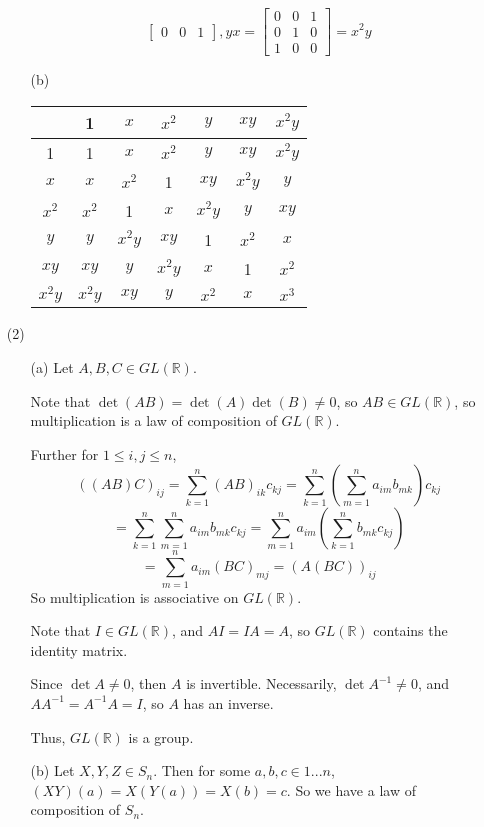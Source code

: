 \begin{itemize}
\begin{itemize}
$$\begin{bmatrix}
0 & 0 & 1
\end{bmatrix}, yx = \begin{bmatrix}
0 & 0 & 1 \\
0 & 1 & 0 \\
1 & 0 & 0
\end{bmatrix} = x^2y$$
\item[(b)]
\begin{tabular}{| c || c | c | c | c | c | c |}
\hline
& 1 & $x$ & $x^2$ & $y$ & $xy$ & $x^2y$ \\
\hline \hline
1 & 1 & $x$ & $x^2$ & $y$ & $xy$ & $x^2y$ \\
\hline
$x$ & $x$ & $x^2$ & 1 & $xy$ & $x^2y$ & $y$ \\
\hline
$x^2$ & $x^2$ & 1 & $x$ & $x^2y$ & $y$ & $xy$ \\
\hline
$y$ & $y$ & $x^2y$ & $xy$ & 1 & $x^2$ & $x$ \\
\hline
$xy$ & $xy$ & $y$ & $x^2y$ & $x$ & 1 & $x^2$ \\
\hline
$x^2y$ & $x^2y$ & $xy$ & $y$ & $x^2$ & $x$ & $x^3$ \\
\hline
\end{tabular}
\end{itemize}
\item[(2)]
\begin{itemize}
\item[(a)]
Let $A, B, C \in GL(\mathbb{R})$. 

Note that $\det(AB) = \det(A)\det(B) \neq 0$, so $AB \in GL(\mathbb{R})$, so multiplication is a law of composition of $GL(\mathbb{R})$.

Further for $1 \leq i,j \leq n$,
$$((AB)C)_{ij} = \sum_{k=1}^n (AB)_{ik}c_{kj} = \sum_{k=1}^n\left(\sum_{m=1}^n a_{im}b_{mk}\right)c_{kj} $$
$$= \sum_{k=1}^n\sum_{m=1}^n a_{im}b_{mk}c_{kj} = \sum_{m=1}^na_{im}\left(\sum_{k=1}^n b_{mk}c_{kj}\right)$$
$$= \sum_{m=1}^na_{im}(BC)_{mj} = (A(BC))_{ij}$$
So multiplication is associative on $GL(\mathbb{R})$.

Note that $I \in GL(\mathbb{R})$, and $AI = IA = A$, so $GL(\mathbb{R})$ contains the identity matrix.

Since $\det A \neq 0$, then $A$ is invertible. Necessarily, $\det A^{-1} \neq 0$, and $AA^{-1} = A^{-1}A = I$, so $A$ has an inverse. 

Thus, $GL(\mathbb{R})$ is a group.
\item[(b)]
Let $X, Y, Z \in S_n$. Then for some $a, b, c \in 1...n$, $(XY)(a) = X(Y(a)) = X(b) = c$. So we have a law of composition of $S_n$.


\end{itemize}
\end{itemize}
